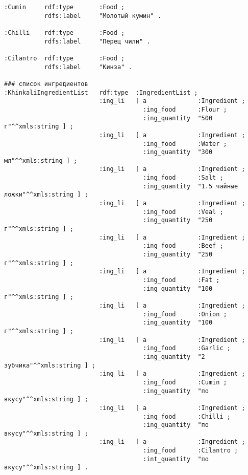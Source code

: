 \documentclass{article}
\begin{document}
\begin{verbatim}
:Cumin     rdf:type       :Food ;
           rdfs:label     "Молотый кумин" .

:Chilli    rdf:type       :Food ;
           rdfs:label     "Перец чили" .

:Cilantro  rdf:type       :Food ;
           rdfs:label     "Кинза" .

### список ингредиентов
:KhinkaliIngredientList   rdf:type  :IngredientList ;
                          :ing_li   [ a              :Ingredient ;
                                      :ing_food      :Flour ;
                                      :ing_quantity  "500 г"^^xmls:string ] ;
                          :ing_li   [ a              :Ingredient ;
                                      :ing_food      :Water ;
                                      :ing_quantity  "300 мл"^^xmls:string ] ;
                          :ing_li   [ a              :Ingredient ;
                                      :ing_food      :Salt ;
                                      :ing_quantity  "1.5 чайные ложки"^^xmls:string ] ;
                          :ing_li   [ a              :Ingredient ;
                                      :ing_food      :Veal ;
                                      :ing_quantity  "250 г"^^xmls:string ] ;
                          :ing_li   [ a              :Ingredient ;
                                      :ing_food      :Beef ;
                                      :ing_quantity  "250 г"^^xmls:string ] ;
                          :ing_li   [ a              :Ingredient ;
                                      :ing_food      :Fat ;
                                      :ing_quantity  "100 г"^^xmls:string ] ;
                          :ing_li   [ a              :Ingredient ;
                                      :ing_food      :Onion ;
                                      :ing_quantity  "100 г"^^xmls:string ] ;
                          :ing_li   [ a              :Ingredient ;
                                      :ing_food      :Garlic ;
                                      :ing_quantity  "2 зубчика"^^xmls:string ] ;
                          :ing_li   [ a              :Ingredient ;
                                      :ing_food      :Cumin ;
                                      :ing_quantity  "по вкусу"^^xmls:string ] ;
                          :ing_li   [ a              :Ingredient ;
                                      :ing_food      :Chilli ;
                                      :ing_quantity  "по вкусу"^^xmls:string ] ;
                          :ing_li   [ a              :Ingredient ;
                                      :ing_food      :Cilantro ;
                                      :int_quantity  "по вкусу"^^xmls:string ] .


\end{verbatim}
\end{document}
